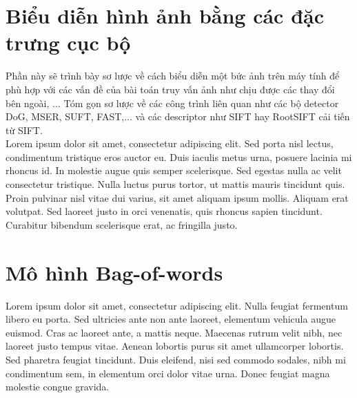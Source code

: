 \section{Biểu diễn hình ảnh bằng các đặc trưng cục bộ}
\label{local-features}
Phần này sẽ trình bày sơ lược về cách biểu diễn một bức ảnh trên máy tính để phù hợp với các vấn đề của bài toán truy vấn ảnh như chịu được các thay đổi bên ngoài, ...  Tóm gọn sơ lược về các công trình liên quan như các bộ detector DoG, MSER, SUFT, FAST,... và các descriptor như SIFT hay RootSIFT cải tiến từ SIFT.\\                                                                                                                                                                                                                                                                                                                                                                                                                                                                                                                                                                                                                                                                        
Lorem ipsum dolor sit amet, consectetur adipiscing elit. Sed porta nisl lectus, condimentum tristique eros auctor eu. Duis iaculis metus urna, posuere lacinia mi rhoncus id. In molestie augue quis semper scelerisque. Sed egestas nulla ac velit consectetur tristique. Nulla luctus purus tortor, ut mattis mauris tincidunt quis. Proin pulvinar nisl vitae dui varius, sit amet aliquam ipsum mollis. Aliquam erat volutpat. Sed laoreet justo in orci venenatis, quis rhoncus sapien tincidunt. Curabitur bibendum scelerisque erat, ac fringilla justo.\\

\section{Mô hình Bag-of-words}
\label{bag-of-words}
Lorem ipsum dolor sit amet, consectetur adipiscing elit. Nulla feugiat fermentum libero eu porta. Sed ultricies ante non ante laoreet, elementum vehicula augue euismod. Cras ac laoreet ante, a mattis neque. Maecenas rutrum velit nibh, nec laoreet justo tempus vitae. Aenean lobortis purus sit amet ullamcorper lobortis. Sed pharetra feugiat tincidunt. Duis eleifend, nisi sed commodo sodales, nibh mi condimentum sem, in elementum orci dolor vitae urna. Donec feugiat magna molestie congue gravida.\\

